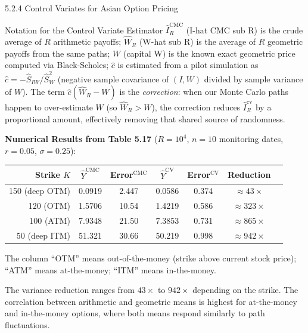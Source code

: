 \documentclass[aspectratio=169,10pt]{beamer}
\begin{document}
\begin{frame}[allowframebreaks]{5.2.4 Control Variates for Asian Option Pricing}
\framebreak

\begin{block}{Notation for the Control Variate Estimator}
  $\hat{I}_R^{\mathrm{CMC}}$ (I-hat CMC sub R) is the crude average of $R$
  arithmetic payoffs; $\hat{W}_R$ (W-hat sub R) is the average of $R$ geometric
  payoffs from the same paths; $W$ (capital W) is the known exact geometric
  price computed via Black-Scholes; $\hat{c}$ is estimated from a pilot
  simulation as $\hat{c} = -\hat{S}_{IW}/\hat{S}_W^2$ (negative sample
  covariance of $(I, W)$ divided by sample variance of $W$).
  The term $\hat{c}(\hat{W}_R - W)$ is the \emph{correction}: when our
  Monte Carlo paths happen to over-estimate $W$ (so $\hat{W}_R > W$), the
  correction reduces $\hat{I}_R^{\mathrm{cv}}$ by a proportional amount,
  effectively removing that shared source of randomness.
\end{block}

\textbf{Numerical Results from Table 5.17}
($R = 10^4$, $n = 10$ monitoring dates, $r = 0.05$, $\sigma = 0.25$):

\begin{center}\small
  \begin{tabular}{rcccccc}
    \toprule
    Strike $K$ &
    $\hat{Y}^{\mathrm{CMC}}$ &
    Error$^{\mathrm{CMC}}$ &
    $\hat{Y}^{\mathrm{CV}}$ &
    Error$^{\mathrm{CV}}$ &
    Reduction \\
    \midrule
    150 (deep OTM) & 0.0919 & 2.447 & 0.0586 & 0.374 & $\approx 43\times$ \\
    120 (OTM)      & 1.5706 & 10.54 & 1.4219 & 0.586 & $\approx 323\times$ \\
    100 (ATM)      & 7.9348 & 21.50 & 7.3853 & 0.731 & $\approx 865\times$ \\
     50 (deep ITM) & 51.321 & 30.66 & 50.219 & 0.998 & $\approx 942\times$ \\
    \bottomrule
  \end{tabular}
\end{center}

\small
The column ``OTM'' means out-of-the-money (strike above current stock price);
``ATM'' means at-the-money; ``ITM'' means in-the-money.

The variance reduction ranges from $43\times$ to $942\times$ depending on the
strike.  The correlation between arithmetic and geometric means is highest for
at-the-money and in-the-money options, where both means respond similarly to
path fluctuations.

\framebreak


\end{frame}
\end{document}
